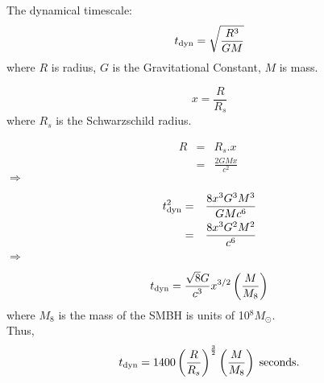 \documentclass[11pt,a4paper]{article}
\begin{document}
\noindent
The dynamical timescale: 
\begin{equation}
  t_{\rm dyn} = \sqrt{\frac{R^3}{GM}}
\label{eqn:t_dyn}  
\end{equation}
where $R$ is radius, $G$ is the Gravitational Constant, $M$ is mass.

\begin{equation}
x = \frac{R}{R_{s}}
\end{equation}
where $R_{s}$  is the Schwarzschild radius. 

\begin{eqnarray}
	R & = &  R_{s} . x   \\ 
	   & = &  \frac{2GM  x}{c^2}   \
\end{eqnarray}
$\Rightarrow$

\begin{eqnarray}
	t_{\rm dyn}^{2} & = &  \frac{8 x^3G^3M^3}{GMc^6} \\
                        	   & = &  \frac{8 x^3G^2M^2}{c^6} 
\end{eqnarray}
$\Rightarrow$

\begin{equation}
           t_{\rm dyn}  =   \frac{\sqrt8 G}{c^3} x^{3/2}   \left (  \frac{M}{M_8} \right ) 
\end{equation}
where $M_8$ is the mass of the SMBH is units of 10$^{8} M_{\odot}$. \\

\noindent
Thus, 
\begin{eqnarray}
                 t_{\rm dyn}  =   1400   \left ( \frac{R}{R_s} \right )^{\frac{3}{2}}     \left (  \frac{M}{M_8} \right ) \; {\rm seconds} .
\end{eqnarray}
\end{document}
